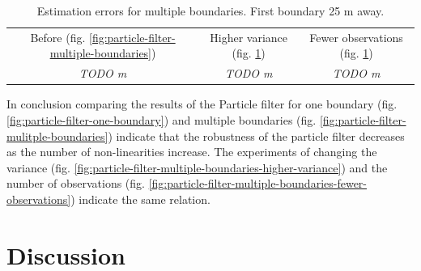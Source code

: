 \documentclass[conference]{IEEEtran}
\begin{document}
\begin{table}[htbp]
    \caption{Estimation errors for multiple boundaries. First boundary 25 m away.}
    \begin{center}
    \begin{tabular}{|c|c|c|}
    \cline{1-3}
		Before (fig. \ref{fig:particle-filter-multiple-boundaries}) & Higher variance (fig. \ref{}) & Fewer observations (fig. \ref{}) \\ %
    \cline{1-3} 
		\textit{TODO m} & \textit{TODO m} & \textit{TODO m} \\
    \hline
    \end{tabular}
    \label{tab:comparing-kalman-particle}
    \end{center}
\end{table}

In conclusion comparing the results of the Particle filter for one boundary (fig. \ref{fig:particle-filter-one-boundary}) and multiple boundaries (fig. \ref{fig:particle-filter-mulitple-boundaries}) indicate that the robustness of the particle filter decreases as the number of non-linearities increase.
The experiments of changing the variance (fig. \ref{fig:particle-filter-multiple-boundaries-higher-variance}) and the number of observations (fig. \ref{fig:particle-filter-multiple-boundaries-fewer-observations}) indicate the same relation.  



\section{Discussion}



\end{document}
